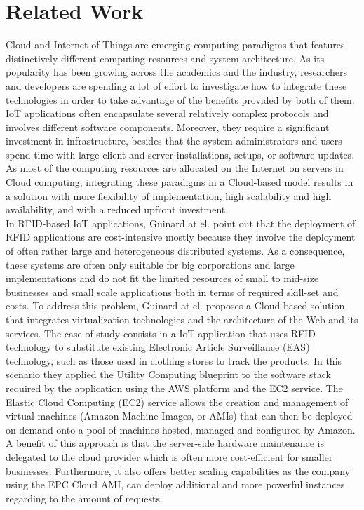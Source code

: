 \section{Related Work}
\label{sec:Related Work}
Cloud and Internet of Things are emerging computing paradigms that features distinctively different computing resources
and system architecture. As its popularity has been growing across the academics and the industry, researchers and developers
are spending a lot of effort to investigate how to integrate these technologies in order to take advantage of the benefits
provided by both of them.\\
IoT applications often encapsulate several relatively complex protocols and involves different software components. Moreover,
they require a significant investment in infrastructure, besides that the system administrators and users spend time with large
client and server installations, setups, or software updates. As most of the computing resources are allocated on the Internet on servers
in Cloud computing, integrating these paradigms in a Cloud-based model results in a solution with more flexibility of implementation,
high scalability and high availability, and with a reduced upfront investment.\\

In RFID-based IoT applications, Guinard at el. \cite{guinard2011cloud} point out that the deployment of RFID applications are cost-intensive mostly
because they involve the deployment of often rather large and heterogeneous distributed systems. As a consequence, these systems are often only
suitable for big corporations and large implementations and do not fit the limited resources of small to mid-size businesses and small scale
applications both in terms of required skill-set and costs. To address this problem, Guinard at el. proposes a Cloud-based solution that
integrates virtualization technologies and the architecture of the Web and its services. The case of study consists in a IoT application that uses
RFID technology to substitute existing Electronic Article Surveillance (EAS) technology, such as those used in clothing stores to track the products.
In this scenario they applied the Utility Computing blueprint to the software stack required by the application using the AWS platform and the EC2 service.
The Elastic Cloud Computing (EC2) service allows the creation and management of virtual machines (Amazon Machine Images, or AMIs) that can then be deployed on
demand onto a pool of machines hosted, managed and configured by Amazon. A benefit of this approach is that the server-side hardware maintenance is delegated to
the cloud provider which is often more cost-efficient for smaller businesses. Furthermore, it also offers better scaling capabilities as the company using the
EPC Cloud AMI, can deploy additional and more powerful instances regarding to the amount of requests.\\

